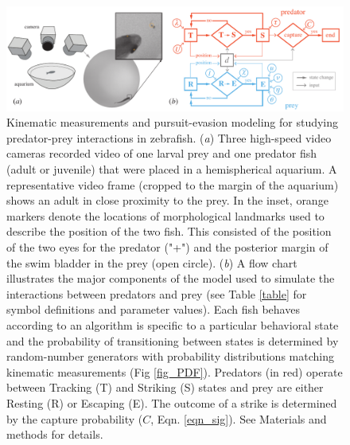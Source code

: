 \documentclass[]{rsos}%
\begin{document}
\pagebreak

\linespread{1}\selectfont %


\begin{figure}[!h]
\centering
	\includegraphics[width=5.5in]{fig_setup}
\caption{
Kinematic measurements and pursuit-evasion modeling for studying predator-prey interactions in zebrafish. 
(\textit{a}) Three high-speed video cameras recorded video of one larval prey and one predator fish (adult or juvenile) that were placed in a hemispherical aquarium. 
A representative video frame (cropped to the margin of the aquarium) shows an adult in close proximity to the prey. 
In the inset, orange markers denote the locations of morphological landmarks used to describe the position of the two fish.
This consisted of the position of the two eyes for the predator ("+") and the posterior margin of the swim bladder in the prey (open circle). 
 (\textit{b}) A flow chart illustrates the major components of the model used to simulate the interactions between predators and prey (see Table \ref{table} for symbol definitions and parameter values). 
Each fish behaves according to an algorithm is specific to a particular behavioral state and the probability of transitioning between states is determined by random-number generators with probability distributions matching kinematic measurements (Fig \ref{fig_PDF}).
Predators (in red) operate between Tracking (T) and Striking (S) states and prey are either Resting (R) or Escaping (E).
The outcome of a strike is determined by the capture probability ($C$, Eqn. \ref{eqn_sig}). 
See Materials and methods for details.
 }
\label{fig_setup}
\end{figure}

\pagebreak
\end{document}
